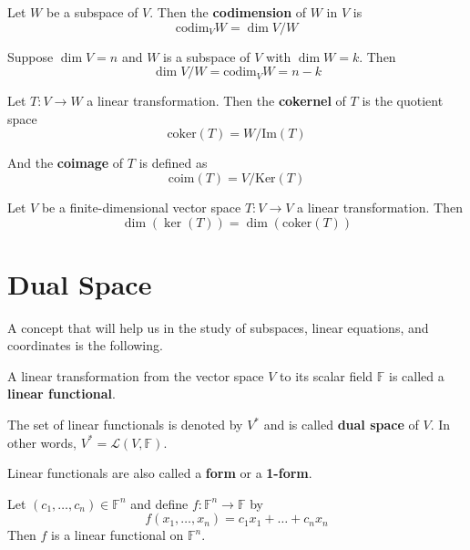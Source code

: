 \begin{definition}[Codimension]
	Let $W$ be a subspace of $V$. Then the \textbf{codimension} of $W$ in $V$ is
	\[
		\text{codim}_V W = \dim V/W
	\]
\end{definition}

\begin{theorem}
	Suppose $\dim V = n$ and $W$ is a subspace of $V$ with $\dim W = k$. Then 
	\[
		\dim V/W = \text{codim}_V W = n-k
	\]
\end{theorem}

\begin{definition}
	Let $T : V \longrightarrow W$ a linear transformation. Then the \textbf{cokernel} of $T$ is the quotient space
	\[
		\text{coker} (T) = W / \text{Im}(T)
	\] 

	And the \textbf{coimage} of $T$ is defined as
	\[
		\text{coim} (T) = V / \text{Ker}(T)
	\]
\end{definition}

\begin{corollary}
	Let $V$ be a finite-dimensional vector space $T : V \longrightarrow V$ a linear transformation. Then 
	\[
		\dim (\ker (T)) = \dim (\text{coker} (T))
	\]
\end{corollary}

\section{Dual Space}

A concept that will help us in the study of subspaces, linear equations, and coordinates is the following.

\begin{definition}
	A linear transformation from the vector space $V$ to its scalar field $\mathbb{F}$ is called a \textbf{linear functional}.
	
	The set of linear functionals is denoted by $V^\ast$ and is called \textbf{dual space} of $V$. In other words, $V^\ast = \mathcal{L}(V, \mathbb{F})$.
\end{definition}

Linear functionals are also called a \textbf{form} or a \textbf{1-form}.

\begin{example}
	Let $(c_1, \ldots, c_n) \in \mathbb{F}^n$ and define $f : \mathbb{F}^n \longrightarrow \mathbb{F}$ by 
	\[
		f(x_1, \ldots, x_n) = c_1 x_1 + \ldots + c_n x_n
	\]
	Then $f$ is a linear functional on $\mathbb{F}^n$.
\end{example}

